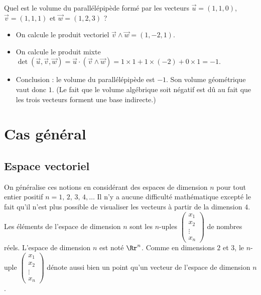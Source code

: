 \documentclass[11pt,class=report,crop=false]{standalone}
\begin{document}
\begin{exemple}
Quel est le volume du parallélépipède formé par les vecteurs $\vec u = (1,1,0)$, $\vec v = (1,1,1)$ et $\vec w = (1,2,3)$ ?


\begin{itemize}
    \item On calcule le produit vectoriel $\vec v \wedge \vec w = (1,-2,1)$.
    \item On calcule le produit mixte $\det(\vec u, \vec v, \vec w) = \vec u \cdot (\vec v \wedge \vec w) = 1 \times 1 + 1 \times (-2) + 0 \times 1 = -1$.
    \item Conclusion : le volume du parallélépipède est $-1$. Son volume géométrique vaut donc $1$. (Le fait que le volume algébrique soit négatif est dû au fait que les trois vecteurs forment une base indirecte.)
\end{itemize}

\end{exemple}


\section{Cas général}

\subsection{Espace vectoriel}


On généralise ces notions en considérant des espaces de dimension $n$
pour tout entier positif $n = 1,\, 2,\, 3,\, 4,\ldots$
Il n'y a aucune difficulté mathématique excepté le fait qu'il n'est plus possible de visualiser les vecteurs à partir de la dimension $4$.
Les éléments de l'espace de dimension $n$ sont les $n$-uples
$\left(\begin{smallmatrix} x_1\\ x_2 \\ \vdots \\ x_n \end{smallmatrix}\right)$
de nombres réels. L'espace de dimension $n$ est noté $\Rr^n$.
Comme en dimensions $2$ et $3$, le $n$-uple
$\left(\begin{smallmatrix} x_1\\x_2 \\  \vdots \\ x_n \end{smallmatrix}\right)$
dénote aussi bien un point qu'un vecteur de l'espace de dimension $n$.
\end{document}
